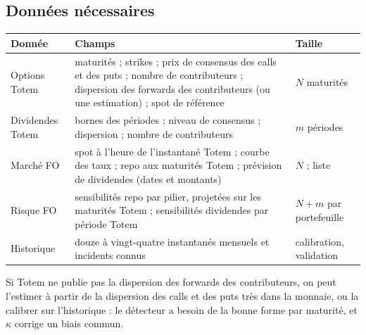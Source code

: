 \subsection{Données nécessaires}
\begin{center}\small
\begin{tabular}{@{}>{\raggedright\arraybackslash}p{2.6cm}>{\raggedright\arraybackslash}p{9.3cm}
>{\raggedright\arraybackslash}p{2.6cm}@{}}
\toprule
Donnée & Champs & Taille\\
\midrule
Options Totem & maturités ; strikes ; prix de consensus des calls et des puts ; nombre de contributeurs ; dispersion des
forwards des contributeurs (ou une estimation) ; spot de référence & $N$ maturités\\
Dividendes Totem & bornes des périodes ; niveau de consensus ; dispersion ; nombre de contributeurs & $m$ périodes\\
Marché FO & spot à l'heure de l'instantané Totem ; courbe des taux ; repo aux maturités Totem ; prévision de
dividendes (dates et montants) & $N$ ; liste\\
Risque FO & sensibilités repo par pilier, projetées sur les maturités Totem ; sensibilités dividendes par période
Totem & $N+m$ par portefeuille\\
Historique & douze à vingt-quatre instantanés mensuels et incidents connus & calibration, validation\\
\bottomrule
\end{tabular}
\end{center}
Si Totem ne publie pas la dispersion des forwards des contributeurs, on peut l'estimer à partir de la dispersion des
calls et des puts très dans la monnaie, ou la calibrer sur l'historique : le détecteur a besoin de la bonne forme par
maturité, et $\kappa$ corrige un biais commun.

